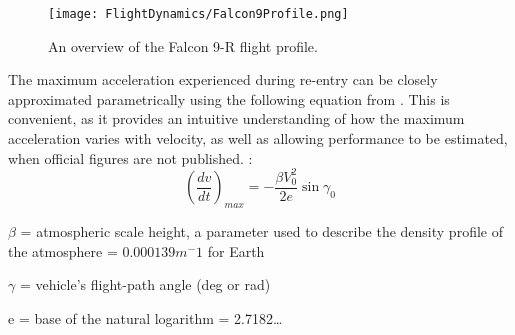 \begin{figure}[!htb] 
    \centering
    \texttt{[image: FlightDynamics/Falcon9Profile.png]} 
    \caption{An overview of the Falcon 9-R flight profile.}
    \label{fig:Falcon9Profile}
\end{figure}


The maximum acceleration experienced during re-entry can be closely approximated parametrically using the following equation from \cite{eastre}. This is convenient, as it provides an intuitive understanding of how the maximum acceleration varies with velocity, as well as allowing performance to be estimated, when official figures are not published. : 
$$(\frac{dv}{dt})_{max} = -\frac{\beta V_0 ^2}{2e} \sin \gamma_0$$

$\beta$ = atmospheric scale height, a parameter used to describe the density profile of the atmosphere = $0.000139 m^-1$ for Earth

$\gamma$ = vehicle's flight-path angle (deg or rad)

e = base of the natural logarithm = 2.7182\ldots
